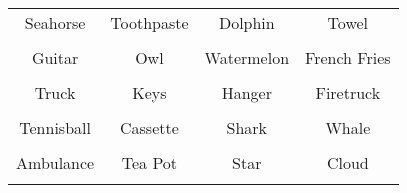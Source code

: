 \documentclass[12pt,a4paper]{article}
\begin{document}
\thispagestyle{empty}
\begin{table}[]
\centering
\Huge
\begin{tabular}{cccc}
 Seahorse& Toothpaste& Dolphin& Towel\\  & & & \\
 Guitar& Owl& Watermelon& French Fries\\  & & & \\
 Truck& Keys& Hanger& Firetruck\\  & & & \\
 Tennisball& Cassette& Shark& Whale\\  & & & \\
 Ambulance& Tea Pot& Star& Cloud\\  & & & \\
\end{tabular}
\end{table}
\end{document}

